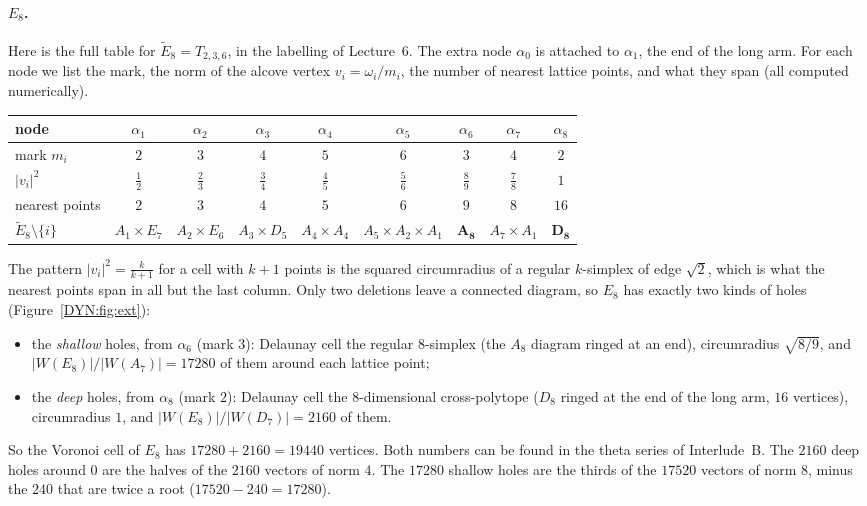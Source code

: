 \documentclass[11pt,openany]{book}
\theoremstyle{plain}
\theoremstyle{definition}
\theoremstyle{remark}
\newcommand{\abs}[1]{\left\lvert #1 \right\rvert}
\begin{document}
\paragraph{$E_8$.} Here is the full table for $\tilde E_8=T_{2,3,6}$, in the labelling of Lecture~6. The
extra node $\alpha_0$ is attached to $\alpha_1$, the end of the long arm. For each node we list the mark,
the norm of the alcove vertex $v_i=\omega_i/m_i$, the number of nearest lattice points, and what they span
(all computed numerically).
\begin{center}
\renewcommand{\arraystretch}{1.15}
\small
\begin{tabular}{lcccccccc}
\toprule
node & $\alpha_1$ & $\alpha_2$ & $\alpha_3$ & $\alpha_4$ & $\alpha_5$ & $\alpha_6$ & $\alpha_7$ & $\alpha_8$\\
\midrule
mark $m_i$ & $2$ & $3$ & $4$ & $5$ & $6$ & $3$ & $4$ & $2$\\
$\abs{v_i}^2$ & $\frac12$ & $\frac23$ & $\frac34$ & $\frac45$ & $\frac56$ & $\frac89$ & $\frac78$ & $1$\\
nearest points & $2$ & $3$ & $4$ & $5$ & $6$ & $9$ & $8$ & $16$\\
$\tilde E_8\setminus\{i\}$ & $A_1{\times}E_7$ & $A_2{\times}E_6$ & $A_3{\times}D_5$ & $A_4{\times}A_4$ & $A_5{\times}A_2{\times}A_1$ & $\mathbf{A_8}$ & $A_7{\times}A_1$ & $\mathbf{D_8}$\\
\bottomrule
\end{tabular}
\end{center}
The pattern $\abs{v_i}^2=\frac k{k+1}$ for a cell with $k+1$ points is the squared circumradius of a
regular $k$-simplex of edge $\sqrt2$, which is what the nearest points span in all but the last column.
Only two deletions leave a connected diagram, so $E_8$ has exactly two kinds of holes (Figure~\ref{DYN:fig:ext}):
\begin{itemize}
\item the \emph{shallow} holes, from $\alpha_6$ (mark $3$): Delaunay cell the regular $8$-simplex (the $A_8$
  diagram ringed at an end), circumradius $\sqrt{8/9}$, and $\abs{W(E_8)}/\abs{W(A_7)}=17280$ of them around
  each lattice point;
\item the \emph{deep} holes, from $\alpha_8$ (mark $2$): Delaunay cell the $8$-dimensional cross-polytope
  ($D_8$ ringed at the end of the long arm, $16$ vertices), circumradius $1$, and
  $\abs{W(E_8)}/\abs{W(D_7)}=2160$ of them.
\end{itemize}
So the Voronoi cell of $E_8$ has $17280+2160=19440$ vertices. Both numbers can be found in the theta series
of Interlude~B. The $2160$ deep holes around $0$ are the halves of the $2160$ vectors of norm $4$. The
$17280$ shallow holes are the thirds of the $17520$ vectors of norm $8$, minus the $240$ that are twice a
root ($17520-240=17280$).
\end{document}
